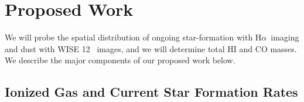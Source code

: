 \documentclass[11pt, preprint]{aastex}
\newcommand{\ha}{H$\alpha$}
\begin{document}
\vspace*{-1cm}\section{Proposed Work} 
\vspace*{-.2cm}
We will probe the spatial distribution of
ongoing star-formation with \ha \ imaging and dust with WISE 12\micron
\ images, and we will determine total HI and CO masses.
We describe the major components of our proposed work below.








\vspace*{-1cm}
\subsection{Ionized Gas and Current Star Formation Rates}
\vspace*{-.3cm}
\end{document}
